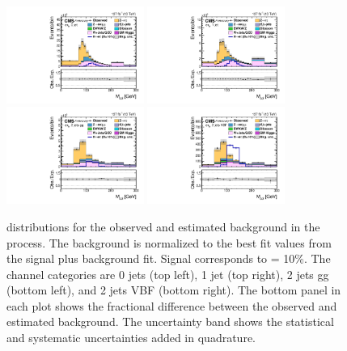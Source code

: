 \begin{figure}[htbp!]
  \centering
  \includegraphics[width=0.4\textwidth]{plots/chapter9/CB/etau/0jet.pdf}
  \includegraphics[width=0.4\textwidth]{plots/chapter9/CB/etau/1jet.pdf} \\
  \includegraphics[width=0.4\textwidth]{plots/chapter9/CB/etau/2jet_gg.pdf}
  \includegraphics[width=0.4\textwidth]{plots/chapter9/CB/etau/2jet_vbf.pdf} \\
  \caption{\mcol distributions for the observed and estimated background in the \ehad process. The background is normalized to the best fit values from the signal plus background fit. Signal corresponds to \BHet = 10\%. The \ehad channel categories are 0 jets (top left), 1 jet (top right), 2 jets gg (bottom left), and 2 jets VBF (bottom right). The bottom panel in each plot shows the fractional difference between the observed and estimated background. The uncertainty band shows the statistical and systematic uncertainties added in quadrature.}
  \label{fig:mcol_ehad}
\end{figure}

